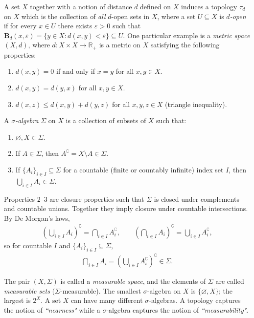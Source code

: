 \documentclass[12pt]{article}
\theoremstyle{remark}
\begin{document}
A set $X$ together with a notion of distance $d$ defined on $X$ induces a topology 
$\tau_d$ on $X$ which is the collection of \emph{all} $d$-open sets in $X$, where a set 
$U\subseteq X$ is \emph{$d$-open} if for every $x\in U$ there exists $\varepsilon>0$ 
such that $\mathbf{B}_d(x,\varepsilon)=\{y\in X: d(x,y)<\varepsilon\}\subseteq U$.
One particular example is a \emph{metric space} $(X,d)$, where $d:X\times X\to\mathbb{R}_{+}$ is a 
metric on $X$ satisfying the following properties:
\begin{enumerate}
    \item $d(x,y) = 0$ if and only if $x=y$ for all $x,y\in X$.
    \item $d(x,y) = d(y,x)$ for all $x,y\in X$.
    \item $d(x,z) \leq d(x,y) + d(y,z)$ for all $x,y,z\in X$ (triangle inequality).
\end{enumerate}

A \emph{$\sigma$-algebra} $\Sigma$ on $X$ is a collection of subsets of $X$ such that: 
\begin{enumerate}
    \item $\varnothing, X \in \Sigma$.
    \item If $A\in\Sigma$, then $A^\complement = X\setminus A\in\Sigma$.
    \item If $\{A_i\}_{i\in I}\subseteq\Sigma$ for a countable (finite or countably infinite) 
        index set $I$, then $\bigcup_{i\in I} A_i \in \Sigma$.
\end{enumerate}
Properties 2--3 are closure properties such that $\Sigma$ is closed under complements and 
countable unions. Together they imply closure under countable intersections. 
By De Morgan's laws,
\begin{align*}
    \left(\bigcup_{i\in I} A_i\right)^\complement = \bigcap_{i\in I} A_i^\complement, \qquad
    \left(\bigcap_{i\in I} A_i\right)^\complement = \bigcup_{i\in I} A_i^\complement,
\end{align*}
so for countable $I$ and $\{A_i\}_{i\in I}\subseteq\Sigma$,
\begin{align*}
    \bigcap_{i\in I} A_i = \left(\bigcup_{i\in I} A_i^\complement\right)^\complement \in \Sigma.
\end{align*}

The pair $(X,\Sigma)$ is called a \emph{measurable space}, and the 
elements of $\Sigma$ are called \emph{measurable sets} ($\Sigma$-measurable). The smallest 
$\sigma$-algebra on $X$ is $\{\varnothing, X\}$; the largest is $2^X$. A set $X$ can have many 
different $\sigma$-algebras. A topology captures the notion of \emph{``nearness"} while a 
$\sigma$-algebra captures the notion of \emph{``measurability"}. 
\end{document}
